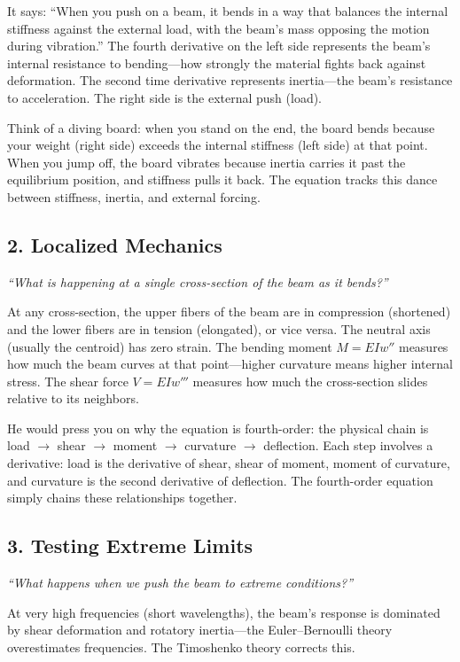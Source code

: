 It says: ``When you push on a beam, it bends in a way that balances the internal stiffness against the external load, with the beam's mass opposing the motion during vibration.'' The fourth derivative on the left side represents the beam's internal resistance to bending---how strongly the material fights back against deformation. The second time derivative represents inertia---the beam's resistance to acceleration. The right side is the external push (load).

Think of a diving board: when you stand on the end, the board bends because your weight (right side) exceeds the internal stiffness (left side) at that point. When you jump off, the board vibrates because inertia carries it past the equilibrium position, and stiffness pulls it back. The equation tracks this dance between stiffness, inertia, and external forcing.

\subsection*{2. Localized Mechanics}
\textit{``What is happening at a single cross-section of the beam as it bends?''}

At any cross-section, the upper fibers of the beam are in compression (shortened) and the lower fibers are in tension (elongated), or vice versa. The neutral axis (usually the centroid) has zero strain. The bending moment $M = EIw''$ measures how much the beam curves at that point---higher curvature means higher internal stress. The shear force $V = EIw'''$ measures how much the cross-section slides relative to its neighbors.

He would press you on why the equation is fourth-order: the physical chain is load $\to$ shear $\to$ moment $\to$ curvature $\to$ deflection. Each step involves a derivative: load is the derivative of shear, shear of moment, moment of curvature, and curvature is the second derivative of deflection. The fourth-order equation simply chains these relationships together.

\subsection*{3. Testing Extreme Limits}
\textit{``What happens when we push the beam to extreme conditions?''}

At very high frequencies (short wavelengths), the beam's response is dominated by shear deformation and rotatory inertia---the Euler--Bernoulli theory overestimates frequencies. The Timoshenko theory corrects this.

